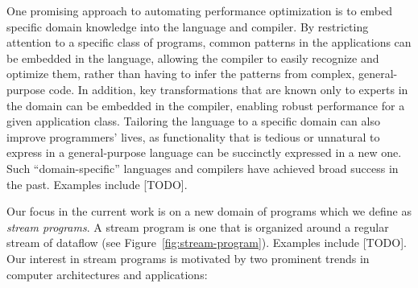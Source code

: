 
One promising approach to automating performance optimization is to
embed specific domain knowledge into the language and compiler.  By
restricting attention to a specific class of programs, common patterns
in the applications can be embedded in the language, allowing the
compiler to easily recognize and optimize them, rather than having to
infer the patterns from complex, general-purpose code.  In addition,
key transformations that are known only to experts in the domain can
be embedded in the compiler, enabling robust performance for a given
application class.  Tailoring the language to a specific domain can
also improve programmers' lives, as functionality that is tedious or
unnatural to express in a general-purpose language can be succinctly
expressed in a new one.  Such ``domain-specific'' languages and
compilers have achieved broad success in the past.  Examples include
[TODO].

Our focus in the current work is on a new domain of programs which we
define as {\it stream programs}.  A stream program is one that is
organized around a regular stream of dataflow (see
Figure~\ref{fig:stream-program}).  Examples include [TODO]. Our
interest in stream programs is motivated by two prominent trends in
computer architectures and applications:

